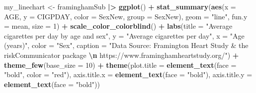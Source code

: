 \documentclass[
]{article}
\newenvironment{Shaded}{\begin{snugshade}}{\end{snugshade}}
\newcommand{\AttributeTok}[1]{\textcolor[rgb]{0.13,0.29,0.53}{#1}}
\newcommand{\DecValTok}[1]{\textcolor[rgb]{0.00,0.00,0.81}{#1}}
\newcommand{\FunctionTok}[1]{\textcolor[rgb]{0.13,0.29,0.53}{\textbf{#1}}}
\newcommand{\NormalTok}[1]{#1}
\newcommand{\OtherTok}[1]{\textcolor[rgb]{0.56,0.35,0.01}{#1}}
\newcommand{\SpecialCharTok}[1]{\textcolor[rgb]{0.81,0.36,0.00}{\textbf{#1}}}
\newcommand{\StringTok}[1]{\textcolor[rgb]{0.31,0.60,0.02}{#1}}
\begin{document}
\begin{Shaded}
\begin{Highlighting}[]
\NormalTok{my\_linechart }\OtherTok{\textless{}{-}}\NormalTok{ framinghamSub }\SpecialCharTok{|\textgreater{}}
  \FunctionTok{ggplot}\NormalTok{() }\SpecialCharTok{+}
  \FunctionTok{stat\_summary}\NormalTok{(}\FunctionTok{aes}\NormalTok{(}\AttributeTok{x =}\NormalTok{ AGE,}
                   \AttributeTok{y =}\NormalTok{ CIGPDAY,}
                   \AttributeTok{color =}\NormalTok{ SexNew,}
                   \AttributeTok{group =}\NormalTok{ SexNew),}
               \AttributeTok{geom =} \StringTok{"line"}\NormalTok{,}
               \AttributeTok{fun.y =}\NormalTok{ mean,}
               \AttributeTok{size =} \DecValTok{1}\NormalTok{) }\SpecialCharTok{+}
  \FunctionTok{scale\_color\_colorblind}\NormalTok{() }\SpecialCharTok{+}
  \FunctionTok{labs}\NormalTok{(}\AttributeTok{title =} \StringTok{"Average cigarettes per day by age and sex"}\NormalTok{,}
       \AttributeTok{y =} \StringTok{"Average cigarettes per day"}\NormalTok{,}
       \AttributeTok{x =} \StringTok{"Age (years)"}\NormalTok{,}
       \AttributeTok{color =} \StringTok{"Sex"}\NormalTok{,}
       \AttributeTok{caption =} \StringTok{"Data Source: Framington Heart Study \& the riskCommunicator package }\SpecialCharTok{\textbackslash{}n}\StringTok{ https://www.framinghamheartstudy.org/"}\NormalTok{) }\SpecialCharTok{+}
  \FunctionTok{theme\_few}\NormalTok{(}\AttributeTok{base\_size =} \DecValTok{10}\NormalTok{) }\SpecialCharTok{+}
  \FunctionTok{theme}\NormalTok{(}\AttributeTok{plot.title =} \FunctionTok{element\_text}\NormalTok{(}\AttributeTok{face =} \StringTok{"bold"}\NormalTok{, }\AttributeTok{color =} \StringTok{"red"}\NormalTok{),}
        \AttributeTok{axis.title.x =} \FunctionTok{element\_text}\NormalTok{(}\AttributeTok{face =} \StringTok{"bold"}\NormalTok{),}
        \AttributeTok{axis.title.y =} \FunctionTok{element\_text}\NormalTok{(}\AttributeTok{face =} \StringTok{"bold"}\NormalTok{))}


\end{Highlighting}
\end{Shaded}
\end{document}
